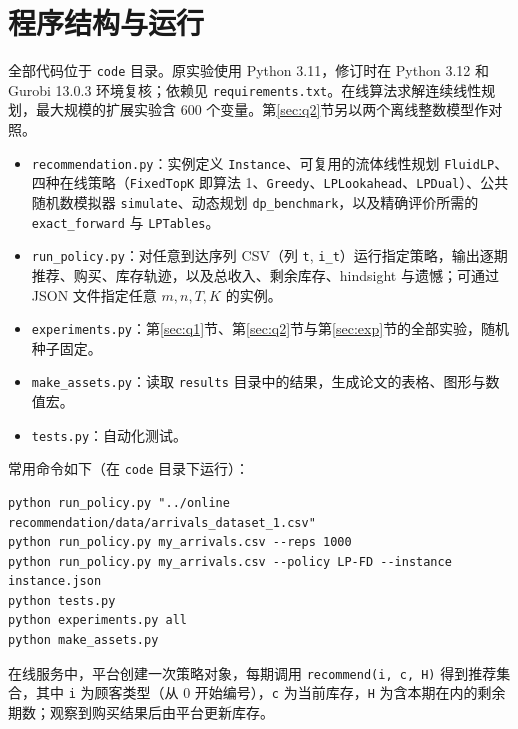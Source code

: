 \section{程序结构与运行}\label{app:code}
全部代码位于 \texttt{code} 目录。原实验使用 Python 3.11，修订时在 Python 3.12 和 Gurobi 13.0.3 环境复核；依赖见 \texttt{requirements.txt}。在线算法求解连续线性规划，最大规模的扩展实验含 600 个变量。第\ref{sec:q2}节另以两个离线整数模型作对照。
\begin{itemize}
\item \texttt{recommendation.py}：实例定义 \texttt{Instance}、可复用的流体线性规划 \texttt{FluidLP}、四种在线策略（\texttt{FixedTopK} 即算法 1、\texttt{Greedy}、\texttt{LPLookahead}、\texttt{LPDual}）、公共随机数模拟器 \texttt{simulate}、动态规划 \texttt{dp\_benchmark}，以及精确评价所需的 \texttt{exact\_forward} 与 \texttt{LPTables}。
\item \texttt{run\_policy.py}：对任意到达序列 CSV（列 \texttt{t}, \texttt{i\_t}）运行指定策略，输出逐期推荐、购买、库存轨迹，以及总收入、剩余库存、hindsight 与遗憾；可通过 JSON 文件指定任意 $m,n,T,K$ 的实例。
\item \texttt{experiments.py}：第\ref{sec:q1}节、第\ref{sec:q2}节与第\ref{sec:exp}节的全部实验，随机种子固定。
\item \texttt{make\_assets.py}：读取 \texttt{results} 目录中的结果，生成论文的表格、图形与数值宏。
\item \texttt{tests.py}：自动化测试。
\end{itemize}
常用命令如下（在 \texttt{code} 目录下运行）：
\begin{verbatim}
python run_policy.py "../online recommendation/data/arrivals_dataset_1.csv"
python run_policy.py my_arrivals.csv --reps 1000
python run_policy.py my_arrivals.csv --policy LP-FD --instance instance.json
python tests.py
python experiments.py all
python make_assets.py
\end{verbatim}
在线服务中，平台创建一次策略对象，每期调用 \texttt{recommend(i, c, H)} 得到推荐集合，其中 \texttt{i} 为顾客类型（从 0 开始编号），\texttt{c} 为当前库存，\texttt{H} 为含本期在内的剩余期数；观察到购买结果后由平台更新库存。

